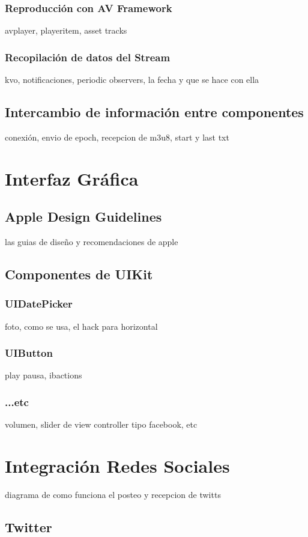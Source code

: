 		\subsubsection{Reproducción con AV Framework}
		avplayer, playeritem, asset tracks		
		\subsubsection{Recopilación de datos del Stream}
		kvo, notificaciones, periodic observers, la fecha y que se hace con ella
		
	\subsection{Intercambio de información entre componentes}
	conexión, envio de epoch, recepcion de m3u8, start y last txt	
	
\clearpage
\section{Interfaz Gráfica}
	\subsection{Apple Design Guidelines}
	las guias de diseño y recomendaciones de apple
	\subsection{Componentes de UIKit}
		\subsubsection{UIDatePicker}
		foto, como se usa, el hack para horizontal
		\subsubsection{UIButton}
		play pausa, ibactions
		\subsubsection{...etc}
		volumen, slider de view controller tipo facebook, etc
\clearpage
\section{Integración Redes Sociales}
	diagrama de como funciona el posteo y recepcion de twitts
	\subsection{Twitter}
